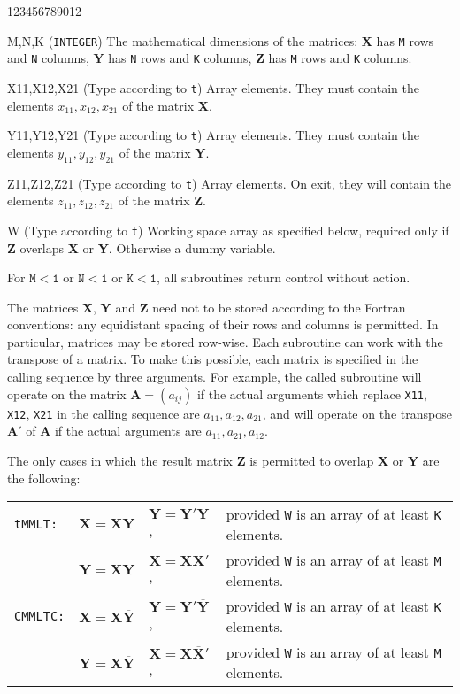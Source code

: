 \begin{DLtt}{123456789012}
\item[M,N,K] ({\tt INTEGER}) The mathematical dimensions of the
matrices: {\bf X} has {\tt M} rows and {\tt N} columns, {\bf Y}
has {\tt N} rows and {\tt K} columns, {\bf Z} has {\tt M} rows and
{\tt K} columns.
\item[X11,X12,X21] (Type according to {\tt t}) Array elements. They must
contain the elements $x_{11},x_{12},x_{21}$ of the matrix {\bf X}.
\item[Y11,Y12,Y21] (Type according to {\tt t}) Array elements. They must
contain the elements $y_{11},y_{12},y_{21}$ of the matrix {\bf Y}.
\item[Z11,Z12,Z21] (Type according to {\tt t}) Array elements. On exit,
they will contain the elements $z_{11},z_{12},z_{21}$ of the matrix
{\bf Z}.
\item[W] (Type according to {\tt t}) Working space array as specified
below, required only if {\bf Z} overlaps {\bf X} or {\bf Y}.
Otherwise a dummy variable.
\end{DLtt}
For $\mathtt{M < 1}$ or $\mathtt{N < 1}$ or $\mathtt{K < 1}$,
all subroutines return control without action.
\par
The matrices {\bf X}, {\bf Y} and {\bf Z} need not to be stored
according to the
Fortran conventions: any equidistant spacing of their rows and
columns is permitted. In particular, matrices may be stored row-wise.
Each subroutine can work with the transpose of a matrix. To make this
possible, each matrix is specified in the calling sequence by three
arguments. For example, the called subroutine will operate on the
matrix $\mathbf{A}=(a_{ij})$ if the actual arguments which replace
{\tt X11}, {\tt X12}, {\tt X21} in the calling sequence are
$a_{11},a_{12},a_{21}$, and will operate on the transpose $\mathbf{A'}$
of {\bf A} if the actual arguments are $a_{11},a_{21},a_{12}$.
\par
The only cases in which the result matrix {\bf Z} is permitted to
overlap {\bf X} or {\bf Y} are the following:
\begin{center}
\begin{tabular}{ll@{\quad or \quad}ll}
{\tt tMMLT:} & $\mathbf{X=XY}$ & $\mathbf{Y=Y'Y}$,
& provided {\tt W} is an array of at least {\tt K} elements. \\
            & $\mathbf{Y=XY}$ & $\mathbf{X=XX'}$,
& provided {\tt W} is an array of at least {\tt M} elements. \\
{\tt CMMLTC:} & $\mathbf{X=X\overline{Y}}$ & $\mathbf{Y=Y'\overline{Y}}$,
& provided {\tt W} is an array of at least {\tt K} elements. \\
              & $\mathbf{Y=X\overline{Y}}$ & $\mathbf{X=X\overline{X}'}$,
& provided {\tt W} is an array of at least {\tt M} elements. \\
\end{tabular}
\end{center}
